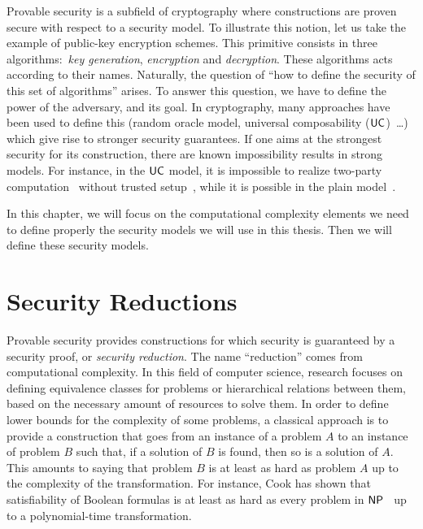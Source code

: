 Provable security is a subfield of cryptography where constructions are proven secure with respect to a security model.
To illustrate this notion, let us take the example of public-key encryption schemes.
This primitive consists in three algorithms:~\textit{key generation}, \textit{encryption} and \textit{decryption}.
These algorithms acts according to their names.
Naturally, the question of ``how to define the security of this set of algorithms'' arises.
To answer this question, we have to define the power of the adversary, and its goal.
In cryptography, many approaches have been used to define this (random oracle model, universal composability ($\textsf{UC}$)~\cite{Can01}\ldots) which give rise to stronger security guarantees.
If one aims at the strongest security for its construction, there are known impossibility results in strong models.
For instance, in the $\textsf{UC}$ model, it is impossible to realize two-party computation~\cite{Yao86} without trusted setup~\cite{CKL06}, while it is possible in the plain model~\cite{LP07}.

In this chapter, we will focus on the computational complexity elements we need to define properly the security models we will use in this thesis.
Then we will define these security models.

\section{Security Reductions}

Provable security provides constructions for which security is guaranteed by a security proof, or \emph{security reduction}.
The name ``reduction'' comes from computational complexity.
In this field of computer science, research focuses on defining equivalence classes for problems or hierarchical relations between them, based on the necessary amount of resources to solve them.
In order to define lower bounds for the complexity of some problems, a classical approach is to provide a construction that goes from an instance of a problem $A$ to an instance of problem $B$ such that, if a solution of $B$ is found, then so is a solution of $A$.
This amounts to saying that problem $B$ is at least as hard as problem $A$ up to the complexity of the transformation.
For instance, Cook has shown that satisfiability of Boolean formulas is at least as hard as every problem in $\textsf{NP}$~\cite{Coo71} up to a polynomial-time transformation.

